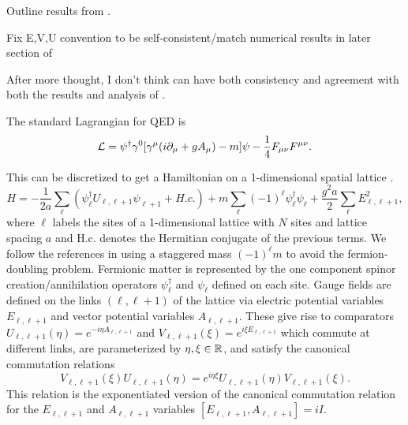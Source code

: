 \documentclass[11pt,reqno]{amsart}
\numberwithin{equation}{section}
\begin{document}
	Outline results from \cite{Ercolessi18,Notarnicola15,Wiese13}.
	
	Fix E,V,U convention to be self-consistent/match numerical results in later section of \cite{Ercolessi18}
	
	After more thought, I don't think can have both consistency and agreement with both the results and analysis of \cite{Ercolessi18}.
	
	The standard Lagrangian for QED is 
	\begin{equation}
		\mathcal{L} = \psi^\dagger\gamma^0[\gamma^\mu(i\partial_\mu+gA_\mu)-m]\psi -\frac{1}{4}F_{\mu\nu}F^{\mu\nu}.
	\end{equation}
	
	This can be discretized to get a Hamiltonian on a 1-dimensional spatial lattice \cite{Ercolessi18,Notarnicola15,Wiese13}.
	\begin{equation}\label{eq:1dQEDLatticeHamiltonian}
		H=-\frac{1}{2a} \sum_\ell (\psi_\ell^\dagger U_{\ell,\ell+1}\psi_{\ell+1}+H.c.) + m\sum_\ell (-1)^\ell \psi_\ell^\dagger\psi_\ell+ \frac{g^2 a}{2} \sum_{\ell} E_{\ell,\ell+1}^2,		
	\end{equation}
	where $\ell$ labels the sites of a 1-dimensional lattice with $N$ sites and lattice spacing $a$ and H.c. denotes the Hermitian conjugate of the previous terms. 
	We follow the references in using a staggered mass $(-1)^\ell m$ to avoid the fermion-doubling problem.
	Fermionic matter is represented by the one component spinor creation/annihilation operators $\psi_\ell^\dagger$ and $\psi_\ell$ defined on each site.
	Gauge fields are defined on the links $(\ell,\ell+1)$ of the lattice via electric potential variables $E_{\ell,\ell+1}$ and vector potential variables $A_{\ell,\ell+1}$.
	These give rise to comparators $U_{\ell,\ell+1}(\eta)=e^{-i\eta A_{\ell,\ell+1}}$ and $V_{{\ell,\ell+1}}(\xi)=e^{i\xi E_{\ell,\ell+1}}$ which commute at different links, are parameterized by $\eta,\xi \in \mathbb{R}$, and satisfy the canonical commutation relations
	\begin{equation}\label{eq:1dQEDunitaryCCR}
		V_{\ell,\ell+1}(\xi)U_{\ell,\ell+1}(\eta)=e^{i\eta\xi}U_{\ell,\ell+1}(\eta)V_{\ell,\ell+1}(\xi).
	\end{equation}
	This relation is the exponentiated version of the canonical commutation relation for the $E_{\ell,\ell+1}$ and $A_{\ell,\ell+1}$ variables $[E_{\ell,\ell+1},A_{\ell,\ell+1}]=iI$.
	
\end{document}
